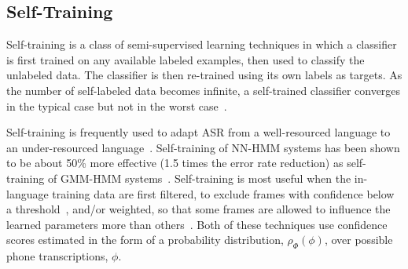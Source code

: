
\subsection{Self-Training}

Self-training is a class of semi-supervised learning techniques in
which a classifier is first trained on any available labeled examples,
then used to classify the unlabeled data.  The classifier is then
re-trained using its own labels as targets.  As the number of
self-labeled data becomes infinite, a self-trained classifier
converges in the typical case but not in the worst
case~\cite{Scudder1965}.  

Self-training is frequently used to adapt ASR from a well-resourced
language to an under-resourced language~\cite{Loof2009,Cetin2008}.
Self-training of NN-HMM systems has been shown to be about 50\% more
effective (1.5 times the error rate reduction) as self-training of
GMM-HMM systems~\cite{Huang2013b}.  Self-training is most useful when
the in-language training data are first filtered, to exclude frames
with confidence below a threshold~\cite{vesely2013-semi,Vu2011b},
and/or weighted, so that some frames are allowed to influence the
learned parameters more than others~\cite{Hsiao2013}.  Both of these
techniques use confidence scores estimated in the form of a
probability distribution, $\rho_\Phi(\phi)$, over possible phone
transcriptions, $\phi$.
